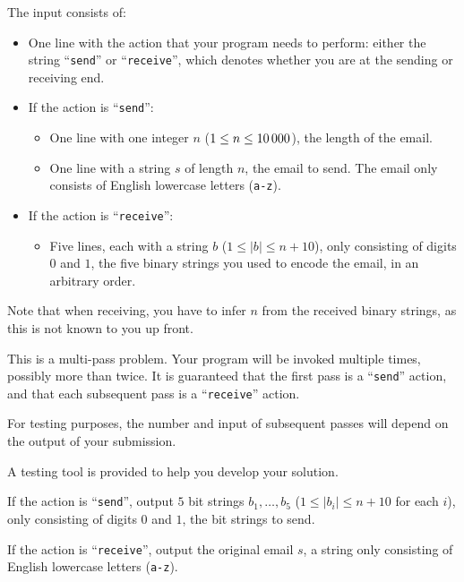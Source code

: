 \begin{Input}
    The input consists of:
    \begin{itemize}
        \item One line with the action that your program needs to perform:
        either the string ``\texttt{send}'' or ``\texttt{receive}'',
        which denotes whether you are at the sending or receiving end.

        \item If the action is ``\texttt{send}'':
        \begin{itemize}
        \item One line with one integer $n$ ($1\leq n \leq 10\,000$), the length of the email.
        \item One line with a string $s$ of length $n$, the email to send. The
        email only consists of English lowercase letters (\texttt{a-z}).
        \end{itemize}
        \item If the action is ``\texttt{receive}'':
        \begin{itemize}
        \item Five lines, each with a string $b$ ($1 \leq |b| \leq n+10$), only consisting of digits $0$ and $1$, the five binary strings you used to encode the email, in an arbitrary order.

        \end{itemize}

    \end{itemize}
    Note that when receiving, you have to infer $n$ from the received binary
    strings, as this is not known to you up front.

    This is a multi-pass problem. Your program will be invoked multiple times,
    possibly more than twice.
    It is guaranteed that the first pass is a ``\texttt{send}'' action,
    and that each subsequent pass is a ``\texttt{receive}'' action.

    For testing purposes, the number and input of subsequent passes will depend
    on the output of your submission.

    A testing tool is provided to help you develop your solution.
\end{Input}

\begin{Output}
    If the action is ``\texttt{send}'', output $5$ bit strings $b_1, \dots, b_5$
    ($1 \leq |b_i| \leq n+10$ for each $i$), only consisting of digits $0$ and $1$, the bit strings to send.

    If the action is ``\texttt{receive}'', output the original email $s$, a
    string only consisting of English lowercase letters (\texttt{a-z}).
\end{Output}

